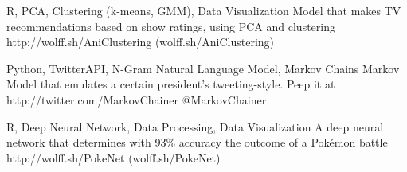 \documentclass[10pt, letterpaper]{awesome-cv}
\begin{document}
\begin{cventries}
\end{cventries}

\begin{projects}
    {R, PCA, Clustering (k-means, GMM), Data Visualization}
    {Model that makes TV recommendations based on show ratings, using PCA and clustering}
    {http://wolff.sh/AniClustering}
    {(wolff.sh/AniClustering)}
    
    {Python, TwitterAPI, N-Gram Natural Language Model, Markov Chains}
    {Markov Model that emulates a certain president's tweeting-style. Peep it at}
    {http://twitter.com/MarkovChainer}
    {@MarkovChainer}
    
    {R, Deep Neural Network, Data Processing, Data Visualization}
    {A deep neural network that determines with 93\% accuracy the outcome of a Pokémon battle}
    {http://wolff.sh/PokeNet}
    {(wolff.sh/PokeNet)}
\end{projects}
    
\end{document}
